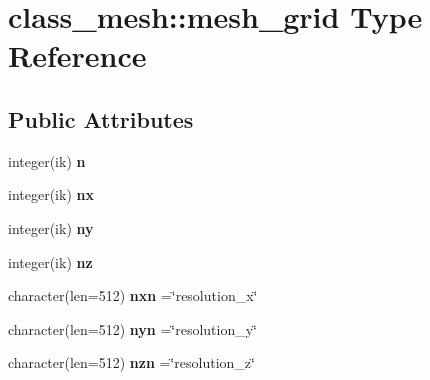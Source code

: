 \hypertarget{structclass__mesh_1_1mesh__grid}{}\section{class\+\_\+mesh\+:\+:mesh\+\_\+grid Type Reference}
\label{structclass__mesh_1_1mesh__grid}
\subsection*{Public Attributes}
\begin{DoxyCompactItemize}
\item 
\mbox{\label{structclass__mesh_1_1mesh__grid_a6e61080a7b1d9826fc345dc0f2e3c948}} 
integer(ik) {\bfseries n}
\item 
\mbox{\label{structclass__mesh_1_1mesh__grid_a9d96d502db35f7da58bf8b788e7dd256}} 
integer(ik) {\bfseries nx}
\item 
\mbox{\label{structclass__mesh_1_1mesh__grid_abb6fd4fce167d69d2d8637a2fa8c7a27}} 
integer(ik) {\bfseries ny}
\item 
\mbox{\label{structclass__mesh_1_1mesh__grid_abdb55640a6aacf340136cccae5f2de35}} 
integer(ik) {\bfseries nz}
\item 
\mbox{\label{structclass__mesh_1_1mesh__grid_a716d5bc62b771451a0538c952c0386c6}} 
character(len=512) {\bfseries nxn} =\char`\"{}resolution\+\_\+x\char`\"{}
\item 
\mbox{\label{structclass__mesh_1_1mesh__grid_ab4050a08c107c7854fa4caddead6b5de}} 
character(len=512) {\bfseries nyn} =\char`\"{}resolution\+\_\+y\char`\"{}
\item 
\mbox{\label{structclass__mesh_1_1mesh__grid_a99b9efdba2e81ff2fbf1cb7bcb2c7324}} 
character(len=512) {\bfseries nzn} =\char`\"{}resolution\+\_\+z\char`\"{}
\item 
\mbox{\label{structclass__mesh_1_1mesh__grid_ab7f0b957d38dd1682f2a7e3015692b40}} 

\end{DoxyCompactItemize}
